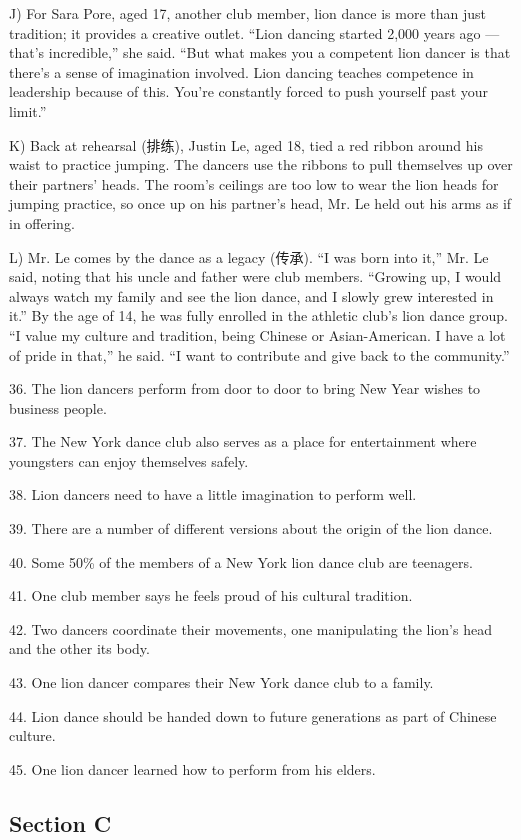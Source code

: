 \documentclass[UTF8,11pt]{ctexart}
\begin{document}
J) For Sara Pore, aged 17, another club member, lion dance is more than just tradition; it provides a creative outlet. “Lion dancing started 2,000 years ago — that’s incredible,” she said. “But what makes you a competent lion dancer is that there’s a sense of imagination involved. Lion dancing teaches competence in leadership because of this. You’re constantly forced to push yourself past your limit.”


K) Back at rehearsal (排练), Justin Le, aged 18, tied a red ribbon around his waist to practice jumping. The dancers use the ribbons to pull themselves up over their partners’ heads. The room’s ceilings are too low to wear the lion heads for jumping practice, so once up on his partner’s head, Mr. Le held out his arms as if in offering.


L) Mr. Le comes by the dance as a legacy (传承). “I was born into it,” Mr. Le said, noting that his uncle and father were club members. “Growing up, I would always watch my family and see the lion dance, and I slowly grew interested in it.” By the age of 14, he was fully enrolled in the athletic club’s lion dance group. “I value my culture and tradition, being Chinese or Asian-American. I have a lot of pride in that,” he said. “I want to contribute and give back to the community.”


36. The lion dancers perform from door to door to bring New Year wishes to business people.


37. The New York dance club also serves as a place for entertainment where youngsters can enjoy themselves safely.


38. Lion dancers need to have a little imagination to perform well.


39. There are a number of different versions about the origin of the lion dance.


40. Some 50\% of the members of a New York lion dance club are teenagers.


41. One club member says he feels proud of his cultural tradition.


42. Two dancers coordinate their movements, one manipulating the lion’s head and the other its body.


43. One lion dancer compares their New York dance club to a family.


44. Lion dance should be handed down to future generations as part of Chinese culture.


45. One lion dancer learned how to perform from his elders.


\subsection*{\textbf{Section C}}
\end{document}
